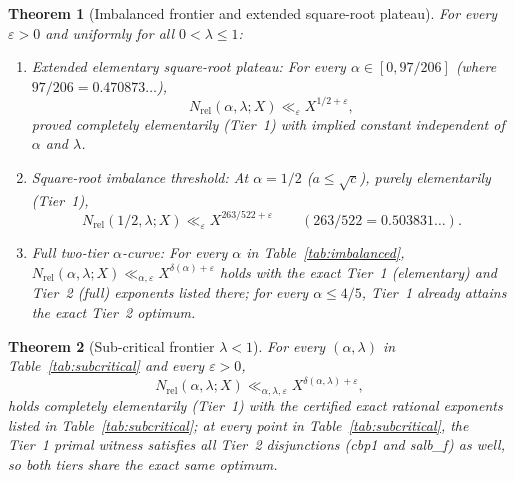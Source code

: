 \documentclass[11pt,a4paper]{amsart}
\theoremstyle{plain}
\newtheorem{theorem}{Theorem}[section]
\theoremstyle{definition}
\theoremstyle{remark}
\newcommand{\eps}{\varepsilon}
\begin{document}
\begin{theorem}[Imbalanced frontier and extended square-root plateau]\label{thm:imbalanced}
For every $\eps > 0$ and uniformly for all $0 < \lambda \le 1$:
\begin{enumerate}[label=(\roman*)]
\item \emph{Extended elementary square-root plateau:} For every $\alpha \in [0, 97/206]$ (where $97/206 = 0.470873\ldots$),
\begin{equation}\label{eq:plateau}
  N_{\mathrm{rel}}(\alpha,\lambda;X) \ll_\eps X^{1/2 + \eps},
\end{equation}
proved completely elementarily (Tier~1) with implied constant independent of $\alpha$ and $\lambda$.
\item \emph{Square-root imbalance threshold:} At $\alpha = 1/2$ ($a \le \sqrt{c}$), purely elementarily (Tier~1),
\begin{equation}\label{eq:alpha_half}
  N_{\mathrm{rel}}(1/2,\lambda;X) \ll_\eps X^{263/522 + \eps} \qquad (263/522 = 0.503831\ldots).
\end{equation}
\item \emph{Full two-tier $\alpha$-curve:} For every $\alpha$ in Table~\ref{tab:imbalanced}, $N_{\mathrm{rel}}(\alpha,\lambda;X) \ll_{\alpha,\eps} X^{\delta(\alpha)+\eps}$ holds with the exact Tier~1 (elementary) and Tier~2 (full) exponents listed there; for every $\alpha \le 4/5$, Tier~1 already attains the exact Tier~2 optimum.
\end{enumerate}
\end{theorem}

\begin{theorem}[Sub-critical frontier $\lambda < 1$]\label{thm:subcritical}
For every $(\alpha,\lambda)$ in Table~\ref{tab:subcritical} and every $\eps > 0$,
\[
  N_{\mathrm{rel}}(\alpha,\lambda;X) \ll_{\alpha,\lambda,\eps} X^{\delta(\alpha,\lambda)+\eps},
\]
holds completely elementarily (Tier~1) with the certified exact rational exponents listed in Table~\ref{tab:subcritical}; at every point in Table~\ref{tab:subcritical}, the Tier~1 primal witness satisfies all Tier~2 disjunctions (\textsf{cbp1} and \textsf{salb\_f}) as well, so both tiers share the exact same optimum.
\end{theorem}
\end{document}
